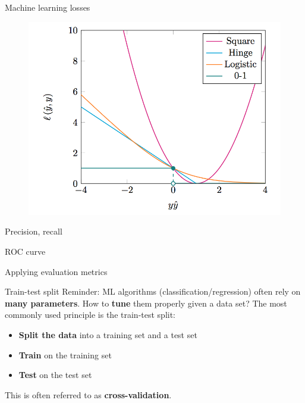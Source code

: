 \documentclass{beamer}
\newcommand{\1}[1]{\mathbbm{1}\left[#1\right]}
\begin{document}
\begin{frame}{Machine learning losses}
\begin{figure}
\centering
\includegraphics[width=\textwidth]{images/losses.png}
\end{figure}
\end{frame}

\begin{frame}{Precision, recall}

\end{frame}

\begin{frame}{ROC curve}

\end{frame}

\begin{frame}
\begin{center}
\Huge{Applying evaluation metrics}
\end{center}
\end{frame}

\begin{frame}{Train-test split}
Reminder: ML algorithms (classification/regression) often rely on \textbf{many parameters}. How to \textbf{tune} them properly given a data set?
\vfill
\pause
The most commonly used principle is the train-test split:
\begin{itemize}
	\item \textbf{Split the data} into a training set and a test set
	\item \textbf{Train} on the training set
	\item \textbf{Test} on the test set
\end{itemize}
\vfill
\pause
This is often referred to as \textbf{cross-validation}.
\end{frame}
\end{document}
